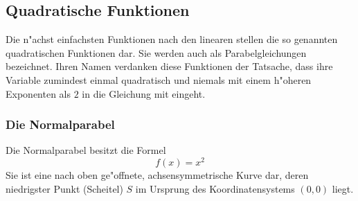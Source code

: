 \subsection{Quadratische Funktionen}
Die n"achst einfachsten Funktionen nach den linearen stellen die so genannten quadratischen Funktionen dar. Sie werden auch als Parabelgleichungen bezeichnet. Ihren Namen verdanken diese Funktionen der Tatsache, dass ihre Variable zumindest einmal quadratisch und niemals mit einem h"oheren Exponenten als $2$ in die Gleichung mit eingeht.

\subsubsection{Die Normalparabel}
Die Normalparabel besitzt die Formel 
\begin{equation*}
f(x) = x^2
\end{equation*}
Sie ist eine nach oben ge"offnete, achsensymmetrische Kurve dar, deren niedrigster Punkt (Scheitel) $S$ im Ursprung des Koordinatensystems $(0,0)$ liegt.


